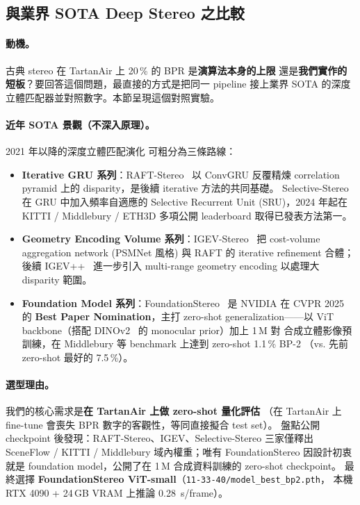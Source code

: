 \documentclass[12pt]{article}
\begin{document}
\subsection{與業界 SOTA Deep Stereo 之比較}
\label{sec:bonus-sota}

\paragraph{動機。} 古典 stereo 在 TartanAir 上 20\,\% 的 BPR 是\textbf{演算法本身的上限}
還是\textbf{我們實作的短板}？要回答這個問題，最直接的方式是把同一 pipeline 接上業界
SOTA 的深度立體匹配器並對照數字。本節呈現這個對照實驗。

\paragraph{近年 SOTA 景觀（不深入原理）。} 2021 年以降的深度立體匹配演化
可粗分為三條路線：
\begin{itemize}
\item \textbf{Iterative GRU 系列}：RAFT-Stereo~\cite{Lipson2021} 以 ConvGRU 反覆精煉
correlation pyramid 上的 disparity，是後續 iterative 方法的共同基礎。
Selective-Stereo~\cite{Wang2024Selective} 在 GRU 中加入頻率自適應的 Selective
Recurrent Unit (SRU)，2024 年起在 KITTI / Middlebury / ETH3D 多項公開
leaderboard 取得已發表方法第一。
\item \textbf{Geometry Encoding Volume 系列}：IGEV-Stereo~\cite{Xu2023} 把 cost-volume
aggregation network (PSMNet 風格) 與 RAFT 的 iterative refinement 合體；後續
IGEV++~\cite{Xu2025} 進一步引入 multi-range geometry encoding 以處理大 disparity 範圍。
\item \textbf{Foundation Model 系列}：FoundationStereo~\cite{Wen2025} 是 NVIDIA
在 CVPR 2025 的 \textbf{Best Paper Nomination}，主打 zero-shot generalization——以
ViT backbone（搭配 DINOv2~\cite{Oquab2023} 的 monocular prior）加上 1\,M 對
合成立體影像預訓練，在 Middlebury 等 benchmark 上達到 zero-shot 1.1\,\% BP-2
（vs. 先前 zero-shot 最好的 7.5\,\%）。
\end{itemize}

\paragraph{選型理由。} 我們的核心需求是\textbf{在 TartanAir 上做 zero-shot 量化評估}
（在 TartanAir 上 fine-tune 會喪失 BPR 數字的客觀性，等同直接擬合 test set）。
盤點公開 checkpoint 後發現：RAFT-Stereo、IGEV、Selective-Stereo 三家僅釋出
SceneFlow / KITTI / Middlebury 域內權重；唯有 FoundationStereo 因設計初衷
就是 foundation model，公開了在 1\,M 合成資料訓練的 zero-shot checkpoint。
最終選擇 \textbf{FoundationStereo ViT-small}（\texttt{11-33-40/model\_best\_bp2.pth}，
本機 RTX 4090 + 24\,GB VRAM 上推論 \SI{0.28}{\second/frame}）。
\end{document}

